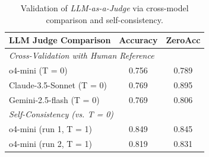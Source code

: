 \begin{table}
\vspace{-4mm} 
\centering
\footnotesize
\begin{tabular}{lcc}
\toprule
\textbf{LLM Judge Comparison} & \textbf{Accuracy} & \textbf{ZeroAcc} \\
\midrule
\multicolumn{3}{l}{\textit{Cross-Validation with Human Reference}} \\
\midrule
o4-mini (T = 0) & 0.756 & 0.789 \\
Claude-3.5-Sonnet (T = 0) & 0.769 & 0.895 \\
Gemini-2.5-flash (T = 0) & 0.769 & 0.806 \\
\midrule
\multicolumn{3}{l}{\textit{Self-Consistency (vs. T = 0)}} \\
\midrule
o4-mini (run 1, T = 1) & 0.849 & 0.845 \\
o4-mini (run 2, T = 1) & 0.819 & 0.831 \\
\bottomrule
\end{tabular}
\vspace{-2mm} 
\caption{Validation of \textit{LLM-as-a-Judge} via cross-model comparison and self-consistency.}
\label{tab:llm-validation}
\vspace{-5mm}
\end{table}







